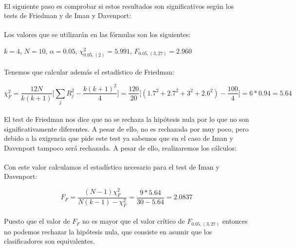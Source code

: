 \documentclass[10pt, a4paper,spanish]{article}
\begin{document}
		\paragraph{}
		El siguiente paso es comprobar si estos resultados son significativos según los tests de Friedman y de Iman y Davenport:

		\paragraph{}
		Los valores que se utilizarán en las fórmulas son los siguientes:

		$k = 4$, $N =10$,
		$\alpha = 0.05$,
		$\chi_{0.05,(2)}^2= 5.991$,
		$F_{0.05, (3,27)} =  2.960$

		\paragraph{}
		Tenemos que calcular además el estadístico de Friedman:

		\[
		\chi_{F}^2 = \frac{12N}{k(k+1)}\Big[\displaystyle\sum_{j}R_{j}^2 - \frac{k(k+1)^2}{4}\Big] = \frac{120}{20}\Big[(1.7^2+ 2.7^2+3^2+2.6^2) - \frac{100}{4}\Big] = 6 * 0.94 = 5.64\]

		\paragraph{}
		El test de Friedman nos dice que no se rechaza la hipótesis nula por lo que no son significativamente diferentes. A pesar de ello, no es rechazada por muy poco, pero debido a la exigencia que pide este test ya sabemos que en el caso de Iman y Davenport tampoco será rechazada. A pesar de ello, realizaremos los cálculos:

		\paragraph{}
		Con este valor calculamos el estadístico necesario para el test de Iman y Davenport:

		\[F_{F}= \frac{(N-1)\chi_{F}^2}{N(k-1)-\chi_{F}^2} = \frac{9 * 5.64}{30-5.64} = 2.0837 \]

		\paragraph{}
		Puesto que el valor de $F_{F}$ no es mayor que el valor crítico de $F_{0.05, (3,27)}$ entonces no podemos rechazar la hipótesis nula, que consiste en asumir que los clasificadores son equivalentes.
\end{document}
